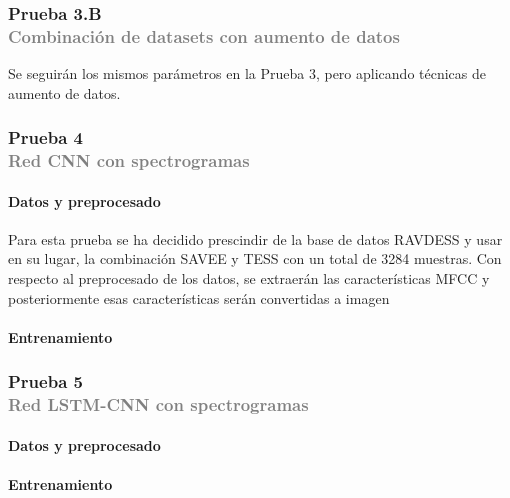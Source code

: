 \documentclass[11pt,a4paper,spanish]{book}
\begin{document}
	\subsubsection[]{\large Prueba 3.B\\ {\normalsize \textcolor{Gray}{Combinación de datasets con aumento de datos}}}
	Se seguirán los mismos parámetros en la Prueba 3, pero aplicando técnicas de aumento de datos.
	
	\subsubsection[]{\large Prueba 4\\ {\normalsize \textcolor{Gray}{Red CNN con spectrogramas}}}
	\hfill\begin{minipage}{\dimexpr\textwidth-1cm}
		
		\paragraph{Datos y preprocesado} Para esta prueba se ha decidido prescindir de la base de datos RAVDESS y usar en su lugar, la combinación SAVEE y TESS con un total de 3284 muestras. Con respecto al preprocesado de los datos, se extraerán las características MFCC y posteriormente esas características serán convertidas a imagen
		\paragraph{Entrenamiento}
		
	\end{minipage}
	\subsubsection[]{\large Prueba 5\\ {\normalsize \textcolor{Gray}{Red LSTM-CNN con spectrogramas}}}
	\hfill\begin{minipage}{\dimexpr\textwidth-1cm}
		
		\paragraph{Datos y preprocesado} 
		\paragraph{Entrenamiento}
		
	\end{minipage}
	
	
	
	
	

		
		
		

	
	
	
		\printbibliography
	
\end{document}
